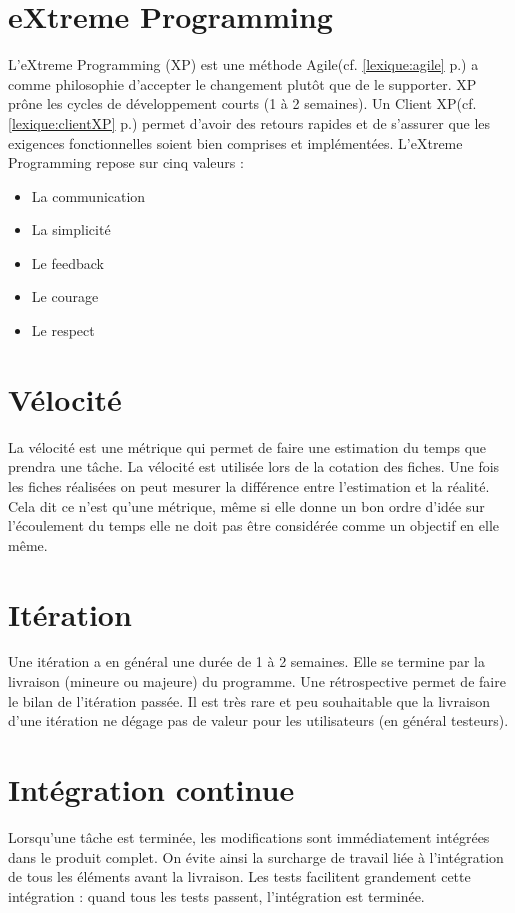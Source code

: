 \section{eXtreme Programming}\label{lexique:XP}
L'eXtreme Programming (XP) est une méthode Agile(cf. \ref{lexique:agile} p.\pageref{lexique:agile}) a comme philosophie d'accepter le changement plutôt que de le supporter. XP prône les cycles de développement courts (1 à 2 semaines). Un Client XP(cf. \ref{lexique:clientXP} p.\pageref{lexique:clientXP}) permet d'avoir des retours rapides et de s'assurer que les exigences fonctionnelles soient bien comprises et implémentées. L'eXtreme Programming repose sur cinq valeurs :
\begin{itemize}
\item{La communication}
\item{La simplicité}
\item{Le feedback}
\item{Le courage}
\item{Le respect}
\end{itemize}
\section{Vélocité}\label{lexique:velocité}
La vélocité est une métrique qui permet de faire une estimation du temps que prendra une tâche. La vélocité est utilisée lors de la cotation des fiches. Une fois les fiches réalisées on peut mesurer la différence entre l'estimation et la réalité. Cela dit ce n'est qu'une métrique, même si elle donne un bon ordre d'idée sur l'écoulement du temps elle ne doit pas être considérée comme un objectif en elle même.
\section{Itération}
Une itération a en général une durée de 1 à 2 semaines. Elle se termine par la livraison (mineure ou majeure) du programme. Une rétrospective permet de faire le bilan de l'itération passée. Il est très rare et peu souhaitable que la livraison d'une itération ne dégage pas de valeur pour les utilisateurs (en général testeurs).
\section{Intégration continue}\label{lexique:integrationContinue}
Lorsqu'une tâche est terminée, les modifications sont immédiatement intégrées dans le produit complet. On évite ainsi la surcharge de travail liée à l'intégration de tous les éléments avant la livraison. Les tests facilitent grandement cette intégration : quand tous les tests passent, l'intégration est terminée. 

